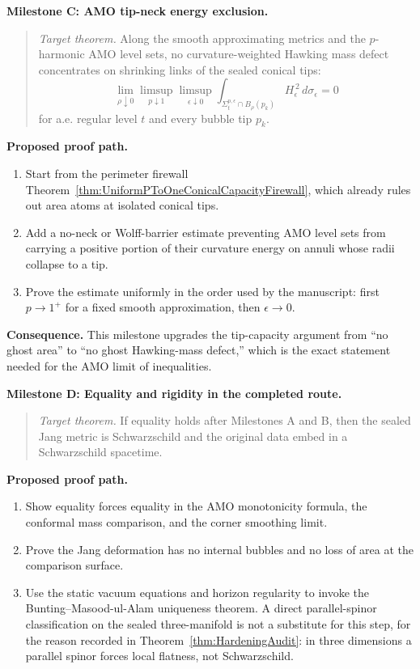 \textbf{Milestone C: AMO tip-neck energy exclusion.}
\begin{quote}
\emph{Target theorem.} Along the smooth approximating metrics and the
\(p\)-harmonic AMO level sets, no curvature-weighted Hawking mass defect
concentrates on shrinking links of the sealed conical tips:
\[
    \lim_{\rho\downarrow0}\limsup_{p\downarrow1}\limsup_{\epsilon\downarrow0}
    \int_{\Sigma^{p,\epsilon}_t\cap B_\rho(p_k)}
        H_{\epsilon}^{\,2}\,d\sigma_{\epsilon}
    =0
\]
for a.e. regular level \(t\) and every bubble tip \(p_k\).
\end{quote}

\textbf{Proposed proof path.}
\begin{enumerate}
    \item Start from the perimeter firewall
    Theorem~\ref{thm:UniformPToOneConicalCapacityFirewall}, which already
    rules out area atoms at isolated conical tips.
    \item Add a no-neck or Wolff-barrier estimate preventing AMO level sets
    from carrying a positive portion of their curvature energy on annuli whose
    radii collapse to a tip.
    \item Prove the estimate uniformly in the order used by the manuscript:
    first \(p\to1^+\) for a fixed smooth approximation, then
    \(\epsilon\to0\).
\end{enumerate}

\textbf{Consequence.} This milestone upgrades the tip-capacity argument from
``no ghost area'' to ``no ghost Hawking-mass defect,'' which is the exact
statement needed for the AMO limit of inequalities.

\textbf{Milestone D: Equality and rigidity in the completed route.}
\begin{quote}
\emph{Target theorem.} If equality holds after Milestones A and B, then the sealed Jang metric is Schwarzschild and the original data embed in a Schwarzschild spacetime.
\end{quote}

\textbf{Proposed proof path.}
\begin{enumerate}
    \item Show equality forces equality in the AMO monotonicity formula, the conformal mass comparison, and the corner smoothing limit.
    \item Prove the Jang deformation has no internal bubbles and no loss of area at the comparison surface.
    \item Use the static vacuum equations and horizon regularity to invoke the
    Bunting--Masood-ul-Alam uniqueness theorem.  A direct parallel-spinor
    classification on the sealed three-manifold is not a substitute for this
    step, for the reason recorded in Theorem~\ref{thm:HardeningAudit}: in
    three dimensions a parallel spinor forces local flatness, not
    Schwarzschild.
\end{enumerate}

